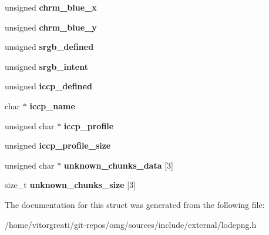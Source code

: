 \begin{DoxyCompactItemize}
\mbox{\label{struct_lode_p_n_g_info_a7394fc7407c168180b2cf64896fbe7fc}} 
unsigned {\bfseries chrm\+\_\+blue\+\_\+x}
\item 
\mbox{\label{struct_lode_p_n_g_info_a9e6af4de8972b039ecb137fb32167505}} 
unsigned {\bfseries chrm\+\_\+blue\+\_\+y}
\item 
\mbox{\label{struct_lode_p_n_g_info_a3a0795a8ec1ddcaac245ba3337054e46}} 
unsigned {\bfseries srgb\+\_\+defined}
\item 
\mbox{\label{struct_lode_p_n_g_info_a35a37c55a3b6c5ff3d064dd26531c72b}} 
unsigned {\bfseries srgb\+\_\+intent}
\item 
\mbox{\label{struct_lode_p_n_g_info_a6304883960715cbcebf45a05c40d5b53}} 
unsigned {\bfseries iccp\+\_\+defined}
\item 
\mbox{\label{struct_lode_p_n_g_info_a0e139ec8c88c920bedb602090a3546d0}} 
char $\ast$ {\bfseries iccp\+\_\+name}
\item 
\mbox{\label{struct_lode_p_n_g_info_a4400b67420e9c225881901bb48eda9b2}} 
unsigned char $\ast$ {\bfseries iccp\+\_\+profile}
\item 
\mbox{\label{struct_lode_p_n_g_info_a11eaae6ecbb308ac1e70dcd10fee6891}} 
unsigned {\bfseries iccp\+\_\+profile\+\_\+size}
\item 
\mbox{\label{struct_lode_p_n_g_info_a8347476da7fc2fc6af4ec7ed44b638c6}} 
unsigned char $\ast$ {\bfseries unknown\+\_\+chunks\+\_\+data} \mbox{[}3\mbox{]}
\item 
\mbox{\label{struct_lode_p_n_g_info_a25a81d760759bd0383ae5a81ba83911d}} 
size\+\_\+t {\bfseries unknown\+\_\+chunks\+\_\+size} \mbox{[}3\mbox{]}
\end{DoxyCompactItemize}


The documentation for this struct was generated from the following file\+:\begin{DoxyCompactItemize}
\item 
/home/vitorgreati/git-\/repos/omg/sources/include/external/lodepng.\+h\end{DoxyCompactItemize}
